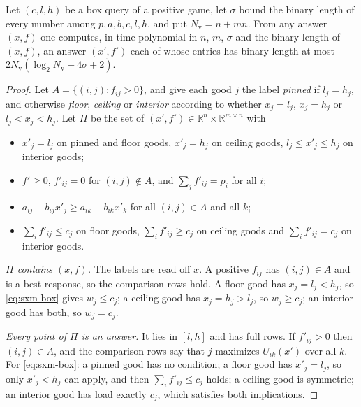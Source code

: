 \begin{lemma}\label{lem:sxm-vertex}
Let $(c,l,h)$ be a box query of a positive game, let $\sigma$ bound the binary length of every number
among $p,a,b,c,l,h$, and put $N_{\mathrm v}=n+mn$. From any answer $(x,f)$ one computes, in time
polynomial in $n$, $m$, $\sigma$ and the binary length of $(x,f)$, an answer $(x',f')$ each of whose
entries has binary length at most $2N_{\mathrm v}(\log_2N_{\mathrm v}+4\sigma+2)$.
\end{lemma}

\begin{proof}
Let $A=\{(i,j):f_{ij}>0\}$, and give each good $j$ the label \emph{pinned} if $l_j=h_j$, and otherwise
\emph{floor}, \emph{ceiling} or \emph{interior} according to whether $x_j=l_j$, $x_j=h_j$ or
$l_j<x_j<h_j$. Let $\Pi$ be the set of $(x',f')\in\mathbb R^n\times\mathbb R^{m\times n}$ with
\begin{itemize}[nosep]
\item $x'_j=l_j$ on pinned and floor goods, $x'_j=h_j$ on ceiling goods, $l_j\le x'_j\le h_j$ on
interior goods;
\item $f'\ge0$, $f'_{ij}=0$ for $(i,j)\notin A$, and $\sum_jf'_{ij}=p_i$ for all $i$;
\item $a_{ij}-b_{ij}x'_j\ge a_{ik}-b_{ik}x'_k$ for all $(i,j)\in A$ and all $k$;
\item $\sum_if'_{ij}\le c_j$ on floor goods, $\sum_if'_{ij}\ge c_j$ on ceiling goods and
$\sum_if'_{ij}=c_j$ on interior goods.
\end{itemize}
\emph{$\Pi$ contains $(x,f)$.} The labels are read off $x$. A positive $f_{ij}$ has $(i,j)\in A$ and is a
best response, so the comparison rows hold. A floor good has $x_j=l_j<h_j$, so \eqref{eq:sxm-box} gives
$w_j\le c_j$; a ceiling good has $x_j=h_j>l_j$, so $w_j\ge c_j$; an interior good has both, so $w_j=c_j$.

\emph{Every point of $\Pi$ is an answer.} It lies in $[l,h]$ and has full rows. If $f'_{ij}>0$ then
$(i,j)\in A$, and the comparison rows say that $j$ maximizes $U_{ik}(x')$ over all $k$. For
\eqref{eq:sxm-box}: a pinned good has no condition; a floor good has $x'_j=l_j$, so only $x'_j<h_j$ can
apply, and then $\sum_if'_{ij}\le c_j$ holds; a ceiling good is symmetric; an interior good has load
exactly $c_j$, which satisfies both implications.


\end{proof}
